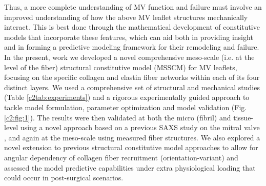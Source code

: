     
    Thus, a more complete understanding of MV function and failure must involve an improved understanding of how the above MV leaflet structures mechanically interact. This is best done through the mathematical development of constitutive models that incorporate these features, which can aid both in providing insight and in forming a predictive modeling framework for their remodeling and failure. In the present, work we developed a novel comprehensive meso-scale (i.e. at the level of the fiber) structural constitutive model (MSSCM) for MV leaflets, focusing on the specific collagen and elastin fiber networks within each of its four distinct layers. We used a comprehensive set of structural and mechanical studies (Table \ref{c2tab:experiments}) and a rigorous experimentally guided approach to tackle model formulation, parameter optimization and model validation (Fig. \ref{c2:fig:1}). The results were then validated at both the micro (fibril) and tissue-level using a novel approach based on a previous SAXS study on the mitral valve \cite{liao_relation_2007}, and again at the meso-scale using measured fiber structures. We also explored a novel extension to previous structural constitutive model approaches \cite{hollander_constitutive_2011,chen_micromechanics_2011,fata_insights_2014,sacks_incorporation_2003} to allow for angular dependency of collagen fiber recruitment (orientation-variant) and assessed the model predictive capabilities under extra physiological loading that could occur in post-surgical scenarios.
    
